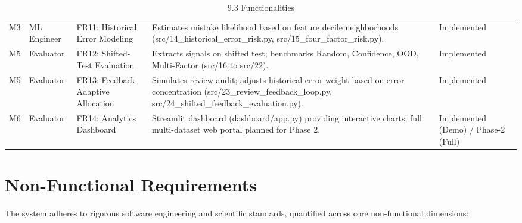 \begin{table}[H]
\begin{tabular}{p{} p{} p{} p{} p{}}
M3 & ML Engineer & FR11: Historical Error Modeling & Estimates mistake likelihood based on feature decile neighborhoods (src/14\_historical\_error\_risk.py, src/15\_four\_factor\_risk.py). & Implemented \\
M5 & Evaluator & FR12: Shifted-Test Evaluation & Extracts signals on shifted test; benchmarks Random, Confidence, OOD, Multi-Factor (src/16 to src/22). & Implemented \\
M5 & Evaluator & FR13: Feedback-Adaptive Allocation & Simulates review audit; adjusts historical error weight based on error concentration (src/23\_review\_feedback\_loop.py, src/24\_shifted\_feedback\_evaluation.py). & Implemented \\
M6 & Evaluator & FR14: Analytics Dashboard & Streamlit dashboard (dashboard/app.py) providing interactive charts; full multi-dataset web portal planned for Phase 2. & Implemented (Demo) / Phase-2 (Full) \\
\bottomrule
\end{tabular}
\caption{9.3 Functionalities}
\end{table}

\section{Non-Functional Requirements}

The system adheres to rigorous software engineering and scientific standards, quantified across core non-functional dimensions:


